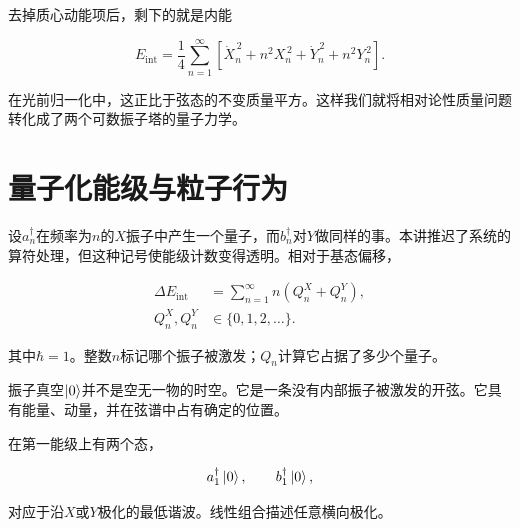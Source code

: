 \begin{classroomqa}
\end{classroomqa}

去掉质心动能项后，剩下的就是内能

\begin{equation}
  E_{\mathrm{int}}
  =
  \frac14
  \sum_{n=1}^{\infty}
  \left[
    \dot X_n^{\,2}+n^2X_n^{\,2}
    +\dot Y_n^{\,2}+n^2Y_n^{\,2}
  \right].
  \label{eq:l02-internal-energy}
\end{equation}

在光前归一化中，这正比于弦态的不变质量平方。这样我们就将相对论性质量问题转化成了两个可数振子塔的量子力学。

\section{量子化能级与粒子行为}

设\(a_n^\dagger\)在频率为\(n\)的\(X\)振子中产生一个量子，而\(b_n^\dagger\)对\(Y\)做同样的事。本讲推迟了系统的算符处理，但这种记号使能级计数变得透明。相对于基态偏移，

\begin{equation}
  \begin{aligned}
    \Delta E_{\mathrm{int}}
    &=\sum_{n=1}^{\infty}n\left(Q_n^X+Q_n^Y\right),\\
    Q_n^X,Q_n^Y&\in\{0,1,2,\ldots\}.
  \end{aligned}
  \label{eq:l02-quantized-energy}
\end{equation}

其中\(\hbar=1\)。整数\(n\)标记哪个振子被激发；\(Q_n\)计算它占据了多少个量子。

振子真空\(\left\lvert0\right\rangle\)并不是空无一物的时空。它是一条没有内部振子被激发的开弦。它具有能量、动量，并在弦谱中占有确定的位置。

在第一能级上有两个态，

\begin{equation}
  a_1^\dagger\left\lvert0\right\rangle,
  \qquad
  b_1^\dagger\left\lvert0\right\rangle,
  \label{eq:l02-level-one}
\end{equation}

对应于沿\(X\)或\(Y\)极化的最低谐波。线性组合描述任意横向极化。

